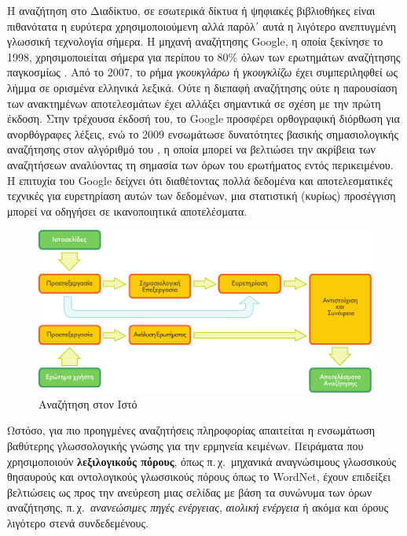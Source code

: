 \documentclass[]{../../metanetpaper}
\begin{document}
\begin{multicols}{2}
Η αναζήτηση στο Διαδίκτυο, σε εσωτερικά δίκτυα ή ψηφιακές βιβλιοθήκες είναι πιθανότατα η ευρύτερα χρησιμοποιούμενη αλλά παρόλ΄ αυτά η λιγότερο ανεπτυγμένη γλωσσική τεχνολογία σήμερα. Η μηχανή αναζήτησης Google, η οποία ξεκίνησε το 1998, χρησιμοποιείται σήμερα για περίπου το 80\% όλων των ερωτημάτων αναζήτησης παγκοσμίως \cite{spi1}. Από το 2007, το ρήμα \textit{γκουκγλάρω} ή \textit{γκουγκλίζω} έχει συμπεριληφθεί ως λήμμα σε ορισμένα ελληνικά λεξικά. Ούτε η διεπαφή αναζήτησης ούτε η παρουσίαση των ανακτημένων αποτελεσμάτων έχει αλλάξει σημαντικά σε σχέση με την πρώτη έκδοση. Στην τρέχουσα έκδοσή του, το Google προσφέρει ορθογραφική διόρθωση για ανορθόγραφες λέξεις, ενώ το 2009 ενσωμάτωσε δυνατότητες βασικής σημασιολογικής αναζήτησης στον αλγόριθμό του \cite{pc1}, η οποία μπορεί να βελτιώσει την ακρίβεια των αναζητήσεων αναλύοντας τη σημασία των όρων του ερωτήματος εντός περικειμένου. Η επιτυχία του Google δείχνει ότι διαθέτοντας πολλά δεδομένα και αποτελεσματικές τεχνικές για ευρετηρίαση αυτών των δεδομένων, μια στατιστική (κυρίως) προσέγγιση μπορεί να οδηγήσει σε ικανοποιητικά αποτελέσματα.

\begin{figure}[htb]
  \center
  \includegraphics[width=\textwidth]{../_media/greek/web_search_architecture}
  \caption{Αναζήτηση στον Ιστό}
  \label{fig:websearcharch_de}
\end{figure}

Ωστόσο, για πιο προηγμένες αναζητήσεις   πληροφορίας  απαιτείται η ενσωμάτωση βαθύτερης γλωσσολογικής γνώσης για την ερμηνεία κειμένων. Πειράματα που χρησιμοποιούν \textbf{λεξιλογικούς πόρους}, όπως π.\,χ.~μηχανικά αναγνώσιμους γλωσσικούς θησαυρούς και οντολογικούς γλωσσικούς πόρους  όπως το WordNet, έχουν επιδείξει βελτιώσεις ως προς την ανεύρεση μιας σελίδας με βάση τα συνώνυμα των όρων αναζήτησης, π.\,χ.~\textit{ανανεώσιμες πηγές ενέργειας}, \textit{αιολική ενέργεια} ή ακόμα και όρους λιγότερο στενά συνδεδεμένους.


\end{multicols}
\end{document}
